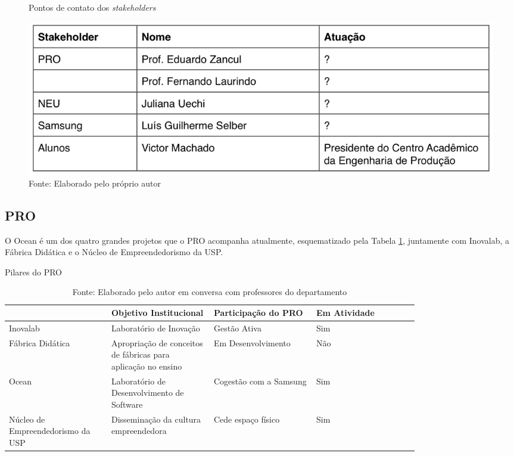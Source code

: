\begin{figure}[H]
\caption{Pontos de contato dos \textit{stakeholders}}
\centerline{\includegraphics[scale=0.5]{img/stakeholderspoc}}
\label{fig:stakeholderspoc}
\caption* {Fonte: Elaborado pelo próprio autor}
\end{figure}


\subsection{PRO}
\label{sec:con_pro}

O Ocean é um dos quatro grandes projetos que o PRO acompanha atualmente, esquematizado pela Tabela \ref{tab:pilares_pro}, juntamente com Inovalab, a Fábrica Didática e o Núcleo de Empreendedorismo da USP.

\begin{table}[H]
\begin{center}
\caption{Pilares do PRO}
\label{tab:pilares_pro}
{\def\arraystretch{2}\tabcolsep=10pt
\begin{tabular}{>{\raggedright}p{0.2\linewidth}>{\raggedright\arraybackslash}p{0.2\linewidth}>{\raggedright\arraybackslash}p{0.2\linewidth}>{\raggedright\arraybackslash}p{0.2\linewidth}}
\hline
     & Objetivo Institucional & Participação do PRO & Em Atividade  \\ \hline
     Inovalab & Laboratório de Inovação & Gestão Ativa & Sim  \\
     Fábrica Didática & Apropriação de conceitos de fábricas para aplicação no ensino & Em Desenvolvimento & Não \\
     Ocean & Laboratório de Desenvolvimento de Software & Cogestão com a Samsung & Sim \\
	 Núcleo de Empreendedorismo da USP & Disseminação da cultura empreendedora & Cede espaço físico & Sim \\ \hline
\end{tabular}%
}
\caption* {Fonte: Elaborado pelo autor em conversa com professores do departamento}
\end{center}
\end{table}

